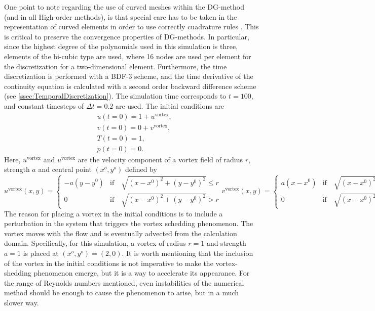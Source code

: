 One point to note regarding the use of curved meshes within the DG-method (and in all High-order methods), is that special care has to be taken in the representation of curved elements in order to use correctly cuadrature rules \parencite{bassiHighOrderAccurateDiscontinuous1997}. This is critical to preserve the convergence properties of DG-methods. In particular, since the highest degree of the polynomials used in this simulation is three, elements of the bi-cubic type are used, where 16 nodes are used per element for the discretization for a two-dimensional element. Furthermore, the time discretization is performed with a BDF-3 scheme, and the time derivative of the continuity equation is calculated with a second order backward difference scheme (see \cref{ssec:TemporalDiscretization}). The simulation time corresponds to $t= 100$, and constant timesteps of $\Delta t = 0.2$ are used. The initial conditions are
\begin{subequations} 
\begin{align}
&u(t=0) = 1 + u^{\text{vortex}},  \\
&v(t=0) = 0 + v^{\text{vortex}},  \\
&T(t=0) = 1,\\
&p(t=0) = 0.
\end{align}
\end{subequations}
Here, $u^{\text{vortex}}$ and $u^{\text{vortex}}$ are the velocity component of a vortex field of radius $r$, strength $a$  and central point $(x^o,y^o)$ defined by 
{
\begin{subequations}
\begin{equation}
	u^{\text{vortex}}(x,y) = 
	\begin{cases}
		-a(y-y^0) & \text{if} \quad\sqrt{(x-x^0)^2+(y-y^0)^2} \leq r \\
		0 & \text{if} \quad\sqrt{(x-x^0)^2+(y-y^0)^2} > r
	\end{cases}
\end{equation}\label{eq:VortexU}
\begin{equation}
	v^{\text{vortex}}(x,y) = 
	\begin{cases}
		a(x-x^0) & \text{if} \quad\sqrt{(x-x^0)^2+(y-y^0)^2} \leq r \\
		0 & \text{if} \quad\sqrt{(x-x^0)^2+(y-y^0)^2} > r
	\end{cases}
\end{equation}	\label{eq:VortexV}
\end{subequations}
}%
The reason for placing a vortex in the initial conditions is to include a perturbation in the system that triggers the vortex schedding phenomenon. The vortex moves with the flow and is eventually advected from the calculation domain. Specifically, for this simulation, a vortex of radius $r=1$ and strength $a = 1$ is placed at $(x^o,y^o) = ( 2,0)$. It is worth mentioning that the inclusion of the vortex in the initial conditions is not imperative to make the vortex-shedding phenomenon emerge, but it is a way to accelerate its appearance. For the range of Reynolds numbers mentioned, even instabilities of the numerical method should be enough to cause the phenomenon to arise, but in a much slower way. 

